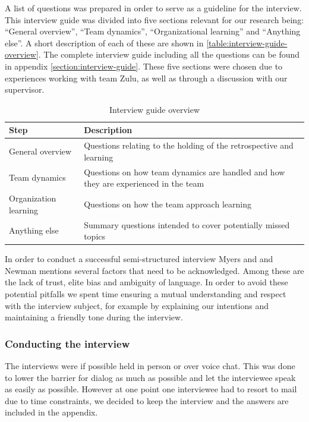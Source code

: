 A list of questions was prepared in order to serve as a guideline for the interview. This interview guide was divided into five sections relevant for our research being: ``General overview'', ``Team dynamics'', ``Organizational learning'' and ``Anything else''. A short description of each of these are shown in \autoref{table:interview-guide-overview}. The complete interview guide including all the questions can be found in appendix \autoref{section:interview-guide}. These five sections were chosen due to experiences working with team Zulu, as well as through a discussion with our supervisor. 

\begin{table}
	\begin{centering}
	\caption{Interview guide overview}
	\label{table:interview-guide-overview}
	\begin{tabular}{l p{}}
	 	Step & Description \\ 
		\hline
		General overview & Questions relating to the holding of the retrospective and learning\\
		Team dynamics & Questions on how team dynamics are handled and how they are experienced in the team \\
		Organization learning & Questions on how the team approach learning \\
		Anything else & Summary questions intended to cover potentially missed topics \\
	\end{tabular}
	\end{centering}
\end{table}

In order to conduct a successful semi-structured interview Myers and and Newman mentions several factors that need to be acknowledged. \cite{Myers2007} Among these are the lack of trust, elite bias and ambiguity of language. In order to avoid these potential pitfalls we spent time ensuring a mutual understanding and respect with the interview subject, for example by explaining our intentions and maintaining a friendly tone during the interview. 

\subsubsection{Conducting the interview}
The interviews were if possible held in person or over voice chat. This was done to lower the barrier for dialog as much as possible and let the interviewee speak as easily as possible. However at one point one interviewee had to resort to mail due to time constraints, we decided to keep the interview and the answers are included in the appendix. 

